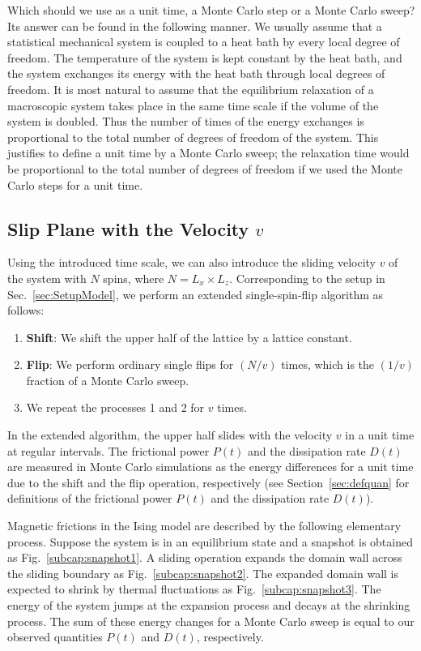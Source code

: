 Which should we use as a unit time, a Monte Carlo step or a Monte Carlo sweep? Its answer can be found in the following manner. We usually assume that a statistical mechanical system is coupled to a heat bath by every local degree of freedom. The temperature of the system is kept constant by the heat bath, and the system exchanges its energy with the heat bath through local degrees of freedom. It is most natural to assume that the equilibrium relaxation of a macroscopic system takes place in the same time scale if the volume of the system is doubled. Thus the number of times of the energy exchanges is proportional to the total number of degrees of freedom of the system. This justifies to define a unit time by a Monte Carlo sweep; the relaxation time would be proportional to the total number of degrees of freedom if we used the Monte Carlo steps for a unit time.

\subsection{Slip Plane with the Velocity $v$}\label{subsec:SlipPlaneWithV}
Using the introduced time scale, we can also introduce the sliding velocity $v$ of the system with $N$ spins, where $N=L_{x}\times L_{z}$. Corresponding to the setup in Sec.~\ref{sec:SetupModel}, we perform an extended single-spin-flip algorithm as follows:
\begin{enumerate}
	\item \textbf{Shift}: We shift the upper half of the lattice by a lattice constant.
	\item \textbf{Flip}: We perform ordinary single flips for $(N/v)$ times, which is the $(1/v)$ fraction of a Monte Carlo sweep.
	\item We repeat the processes 1 and 2 for $v$ times.
\end{enumerate}
In the extended algorithm, the upper half slides with the velocity $v$ in a unit time at regular intervals. The frictional power $P(t)$ and the dissipation rate $D(t)$ are measured in Monte Carlo simulations as the energy differences for a unit time due to the shift and the flip operation, respectively (see Section~\ref{sec:defquan} for definitions of the frictional power $P(t)$ and the dissipation rate $D(t)$).

Magnetic frictions in the Ising model are described by the following elementary process. Suppose the system is in an equilibrium state and a snapshot is obtained as Fig.~\ref{subcap:snapshot1}. A sliding operation expands the domain wall across the sliding boundary as Fig.~\ref{subcap:snapshot2}. The expanded domain wall is expected to shrink by thermal fluctuations as Fig.~\ref{subcap:snapshot3}. The energy of the system jumps at the expansion process and decays at the shrinking process. The sum of these energy changes for a Monte Carlo sweep is equal to our observed quantities $P(t)$ and $D(t)$, respectively.

